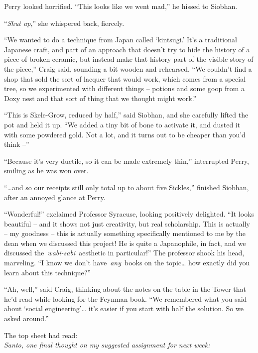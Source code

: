 Perry looked horrified. ``This looks like we went mad,'' he hissed to
Siobhan.

``\emph{Shut up},'' she whispered back, fiercely.

``We wanted to do a technique from Japan called `kintsugi.' It's a
traditional Japanese craft, and part of an approach that doesn't try to
hide the history of a piece of broken ceramic, but instead make that
history part of the visible story of the piece,'' Craig said, sounding a
bit wooden and rehearsed. ``We couldn't find a shop that sold the sort
of lacquer that would work, which comes from a special tree, so we
experimented with different things -- potions and some goop from a Doxy
nest and that sort of thing that we thought might work.''

``This is Skele-Grow, reduced by half,'' said Siobhan, and she carefully
lifted the pot and held it up. ``We added a tiny bit of bone to activate
it, and dusted it with some powdered gold. Not a lot, and it turns out
to be cheaper than you'd think --''

``Because it's very ductile, so it can be made extremely thin,''
interrupted Perry, smiling as he was won over.

``\ldots and so our receipts still only total up to about five
Sickles,'' finished Siobhan, after an annoyed glance at Perry.

``Wonderful!'' exclaimed Professor Syracuse, looking positively
delighted. ``It looks beautiful -- and it shows not just creativity, but
real scholarship. This is actually -- my goodness -- this is actually
something specifically mentioned to me by the dean when we discussed
this project! He is quite a Japanophile, in fact, and we discussed
the~\emph{wabi-sabi}~aesthetic in particular!'' The professor shook his
head, marveling. ``I know we don't have~\emph{any}~books on the
topic\ldots{} how exactly did you learn about this technique?''

``Ah, well,'' said Craig, thinking about the notes on the table in the
Tower that he'd read while looking for the Feynman book. ``We remembered
what you said about `social engineering'\ldots{} it's easier if you
start with half the solution. So we asked around.''

The top sheet had read:\\

\emph{Santo, one final thought on my suggested assignment for next
week:}

